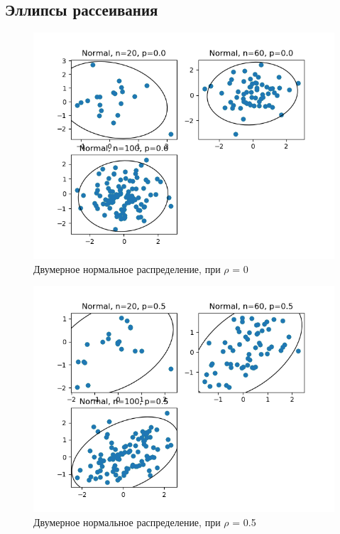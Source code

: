 \documentclass[a4]{article}
\begin{document}
	\subsection{Эллипсы рассеивания}
		\begin{center}
			
			\begin{figure}[h!]
				\includegraphics[width=\textwidth]{Normal0.png} 
				\caption[Двумерное нормальное распределение, при $\rho$ = 0]{Двумерное нормальное распределение, при $\rho$ = 0}
			\end{figure}
			\newpage
			\begin{figure}[h!]
				\includegraphics[width=\textwidth]{Normal5.png} 
				\caption[Двумерное нормальное распределение, при $\rho$ = 0.5]{Двумерное нормальное распределение, при $\rho$ = 0.5}

\end{figure}
\end{center}
\end{document}
